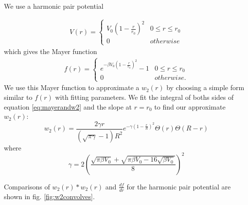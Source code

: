 \documentclass[letterpaper,twocolumn,amsmath,amssymb,prb]{revtex4-1}
\begin{document}

We use a harmonic pair potential

\begin{align}
  V(r) =
  \begin{cases}
    V_0 \left ( 1 - \frac{r}{r_0} \right )^2 & 0 \leq r \leq r_0\\
    0 & otherwise
  \end{cases}
\end{align}
which gives the Mayer function 
\begin{align}\label{eq:harmonicmayer}
  f(r) =
  \begin{cases}
    e^{-\beta V_0 \left( 1 - \frac{r}{r_0} \right)^2} - 1 & 0 \leq r
    \leq r_0 \\
    0 & otherwise.
  \end{cases} 
\end{align}
We use this Mayer function to approximate a $w_2(r)$ by choosing a
simple form similar to $f(r)$ with fitting parameters. We fit the
integral of boths sides of equation \ref{eq:mayerandw2} and the
slope at $r=r_0$ to find our approximate $w_2(r)$: 
\begin{equation}
  w_2(r) = \frac{2\gamma r}{(\sqrt{\pi \gamma} - 1)R^2} e^{-\gamma
    \left ( 1 - \frac{r}{R} \right )^2}\Theta(r) \Theta (R - r)
\end{equation}
where
\begin{equation}
  \gamma = 2 \left(\frac{\sqrt{\pi \beta V_0} + \sqrt{\pi \beta V_0 -
    16\sqrt{\beta V_0}}}{8}\right)^2
\end{equation}

Comparisons of $w_2(r)\ast w_2(r)$ and $\frac{df}{dr}$ for the harmonic
pair potential are shown in fig. \ref{fig:w2convolves}.
\end{document}

